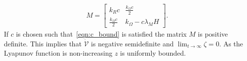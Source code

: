 \documentclass[letterpaper, 10 pt, conference]{ieeeconf}  %
\begin{document}
	\begin{gather}
		M = \begin{bmatrix}
			k_R c & \frac{k_\Omega c}{2} \\
			\frac{k_\Omega c}{2} & k_\Omega - c \lambda_M H
		\end{bmatrix} .
	\end{gather}
	If \( c \) is chosen such that~\cref{eqn:c_bound} is satisfied the matrix \( M \) is positive definite.
	This implies that $\dot{\mathcal{V}}$ is negative semidefinite and $\lim_{t\to\infty} \zeta=0$. As the Lyapunov function is non-increasing $z$ is uniformly bounded. 
%	
%	

                                  


\end{document}
